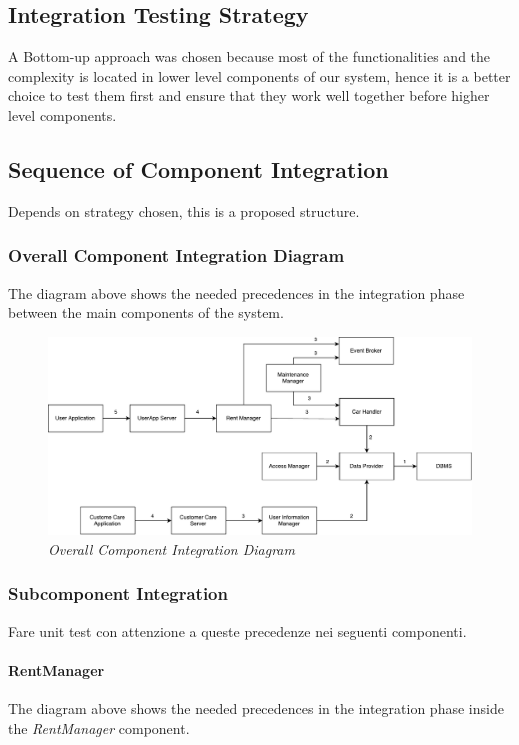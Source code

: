 \subsection{Integration Testing Strategy}
A Bottom-up approach was chosen because most of the functionalities and the complexity is located in lower level components of our system, hence it is a better choice to test them first and ensure that they work well together before higher level components.

\subsection{Sequence of Component Integration}
Depends on strategy chosen, this is a proposed structure.

\subsubsection{Overall Component Integration Diagram} 
The diagram above shows the needed precedences in the integration phase between the main components of the system.

	\begin{figure}[h]
			\centering
			\includegraphics[width=\linewidth]{img/overallIntegration}
			\caption{
				\label{fig:overallIntegration} 
				\emph{Overall Component Integration Diagram}
			}
	\end{figure}

\clearpage

\subsubsection{Subcomponent Integration} 
Fare unit test con attenzione a queste precedenze nei seguenti componenti.

\paragraph{RentManager} 
The diagram above shows the needed precedences in the integration phase inside the \emph{RentManager} component.
